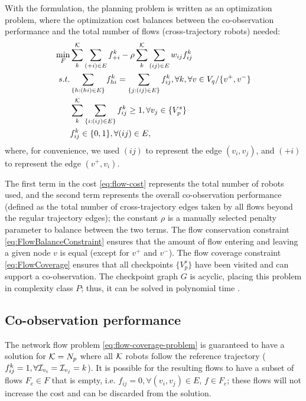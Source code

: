 \documentclass[10pt,twocolumn,twoside]{IEEEtran}
\begin{document}
With the formulation, the planning problem is written as an optimization problem, where the optimization cost balances between the co-observation performance and the total number of flows (cross-trajectory robots) needed:
 \begin{subequations} \label{eq:flow-coverage-problem}
     \begin{align}
        \min_{F} &\sum^{\mathcal{K}}_{k} \sum_{(+i)\in E} f^{k}_{+i} - \rho \sum^{\mathcal{K}}_k \sum_{(ij)\in E} w_{ij} f^k_{ij} \label{eq:flow-cost}\\
        s.t. & \sum_{\{h:(hi) \in E\}}f^k_{hi}=\sum_{\{j:(ij) \in E\}}f^k_{ij},  \forall k,\forall v \in V_{q} / \{v^{+}, v^{-}\}  \label{eq:FlowBalanceConstraint}\\
        & \sum^{\mathcal{K}}_k\sum_{\{i:(ij)\in E \}} f^k_{ij} \geq 1, \forall v_{j} \in \{V^{s}_{p}\} \label{eq:FlowCoverage}\\
        & f^k_{ij} \in \{0,1\} ,  \forall (ij)\in E ,\label{eq:SingleFLowCapacity}
     \end{align}
 \end{subequations}
where, for convenience, we used $(ij)$ to represent the edge $(v_{i},v_{j})$, and $(+i)$ to represent the edge $(v^{+},v_{i})$.

The first term in the cost \eqref{eq:flow-cost} represents the total number of robots used, and the second term represents the overall co-observation performance (defined as the total number of cross-trajectory edges taken by all flows beyond the regular trajectory edges); the constant $\rho$ is a manually selected penalty parameter to balance between the two terms. 
 The flow conservation constraint \eqref{eq:FlowBalanceConstraint} ensures that the amount of flow entering and leaving a given node $v$ is equal (except for $v^{+}$ and $v^{-}$). The flow coverage constraint \eqref{eq:FlowCoverage} ensures that all checkpoints $ \{V^{s}_{p}\}$ have been visited and can support a co-observation. The checkpoint graph $G$ is acyclic, placing this problem in complexity class $P$; thus, it can be solved in polynomial time \cite{1702662}. 

\subsection{Co-observation performance}
The network flow problem \eqref{eq:flow-coverage-problem} is guaranteed to have a solution for $\mathcal{K}=N_{p}$ where all $\mathcal{K}$ robots follow the reference trajectory ($f^{k}_{ij}=1, \forall \mathcal{I}_{v_{i}}=\mathcal{I}_{v_{j}}=k$). 
It is possible for the resulting flows to have a subset of flows $F_{e} \in F$ that is empty, i.e. $f_{ij}=0, \forall (v_{i},v_{j})\in E$, $f\in F_{e}$; these flows will not increase the cost and can be discarded from the solution.  
\end{document}
